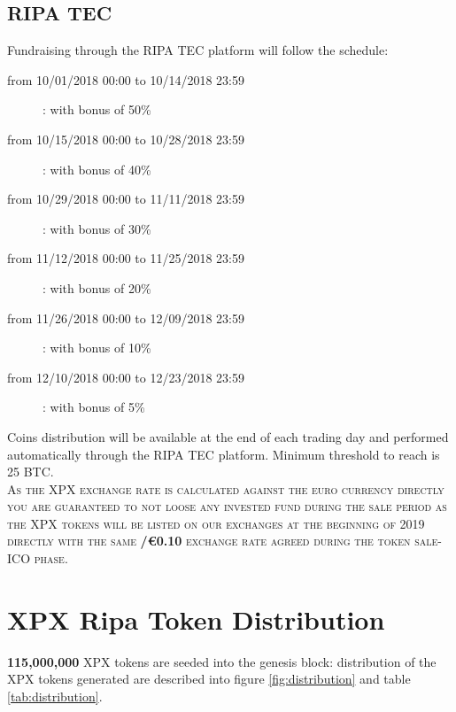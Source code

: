 \documentclass[11pt,fleqn,oneside]{book} %
\begin{document}
\subsection{RIPA TEC}
Fundraising through the RIPA TEC platform will follow the schedule:
\begin{description}
	\item[from 10/01/2018 00:00 to 10/14/2018 23:59]: with bonus of 50\% 
	\item[from 10/15/2018 00:00 to 10/28/2018 23:59]: with bonus of 40\% 
	\item[from 10/29/2018 00:00 to 11/11/2018 23:59]: with bonus of 30\% 
	\item[from 11/12/2018 00:00 to 11/25/2018 23:59]: with bonus of 20\% 
	\item[from 11/26/2018 00:00 to 12/09/2018 23:59]: with bonus of 10\% 
	\item[from 12/10/2018 00:00 to 12/23/2018 23:59]: with bonus of 5\% 
\end{description}
Coins distribution will be available at the end of each trading day and performed automatically through the RIPA TEC platform. Minimum
threshold to reach is 25 BTC.\\

\textsc{As the XPX exchange rate is calculated against the euro currency directly you are guaranteed to not loose any invested fund
during the sale period as the XPX tokens will be listed on our exchanges at the beginning of 2019 directly with the same \textbf{\PHP/\euro0.10}
exchange rate agreed during the token sale-ICO phase}.

\section{XPX Ripa Token Distribution}
\textbf{115,000,000} XPX tokens are seeded into the genesis block: distribution of the XPX tokens generated are described into
figure \ref{fig:distribution} and table \ref{tab:distribution}.

\vspace{5mm}
	\label{fig:distribution}
\end{document}
